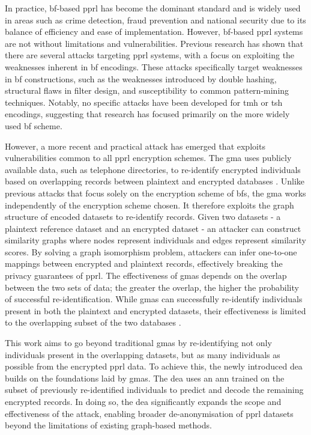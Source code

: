 In practice, \ac{bf}-based \ac{pprl} has become the dominant standard and is widely used in areas such as crime detection, fraud prevention and national security due to its balance of efficiency and ease of implementation.
However, \ac{bf}-based \ac{pprl} systems are not without limitations and vulnerabilities. 
Previous research has shown that there are several attacks targeting \ac{pprl} systems, with a focus on exploiting the weaknesses inherent in \ac{bf} encodings.
These attacks specifically target weaknesses in \ac{bf} constructions, such as the weaknesses introduced by double hashing, structural flaws in filter design, and susceptibility to common pattern-mining techniques. 
Notably, no specific attacks have been developed for \ac{tmh} or \ac{tsh} encodings, suggesting that research has focused primarily on the more widely used \ac{bf} scheme. \cite{vidanage2020graph}

However, a more recent and practical attack has emerged that exploits vulnerabilities common to all \ac{pprl} encryption schemes. 
The \ac{gma} uses publicly available data, such as telephone directories, to re-identify encrypted individuals based on overlapping records between plaintext and encrypted databases \cite{vidanage2020graph, schaefer2024}. 
Unlike previous attacks that focus solely on the encryption scheme of \ac{bf}s, the \ac{gma} works independently of the encryption scheme chosen.
It therefore exploits the graph structure of encoded datasets to re-identify records. Given two datasets - a plaintext reference dataset and an encrypted dataset - an attacker can construct similarity graphs where nodes represent individuals and edges represent similarity scores. 
By solving a graph isomorphism problem, attackers can infer one-to-one mappings between encrypted and plaintext records, effectively breaking the privacy guarantees of \ac{pprl}. 
The effectiveness of \ac{gma}s depends on the overlap between the two sets of data; the greater the overlap, the higher the probability of successful re-identification. 
While \ac{gma}s can successfully re-identify individuals present in both the plaintext and encrypted datasets, their effectiveness is limited to the overlapping subset of the two databases \cite{schaefer2024,vidanage2020graph}.

This work aims to go beyond traditional \ac{gma}s by re-identifying not only individuals present in the overlapping datasets, but as many individuals as possible from the encrypted \ac{pprl} data. 
To achieve this, the newly introduced \ac{dea} builds on the foundations laid by \ac{gma}s. 
The \ac{dea} uses an \ac{ann} trained on the subset of previously re-identified individuals to predict and decode the remaining encrypted records. 
In doing so, the \ac{dea} significantly expands the scope and effectiveness of the attack, enabling broader de-anonymisation of \ac{pprl} datasets beyond the limitations of existing graph-based methods.

